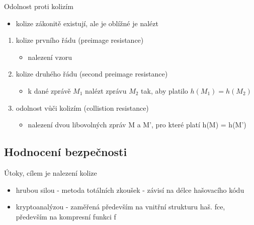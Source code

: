 Odolnost proti kolizím
\begin{itemize}
    \item kolize zákonitě existují, ale je oblížné je nalézt
\end{itemize}
\begin{enumerate}
    \item kolize prvního řádu (preimage resistance)
    \begin{itemize}
        \item nalezení vzoru
    \end{itemize}
    \item kolize druhého řádu (second preimage resistance)
    \begin{itemize}
        \item k dané zprávě $M_{1}$ nalézt zprávu $M_{2}$ tak, aby platilo $h(M_{1}) = h(M_{2})$
    \end{itemize}
    \item odolnost vůči kolizím (collistion resistance)
    \begin{itemize}
        \item nalezení dvou libovolných zpráv M a M', pro které platí h(M) = h(M') \\
    \end{itemize}
\end{enumerate}

\subsection{Hodnocení bezpečnosti}
Útoky, cílem je nalezení kolize
\begin{itemize}
    \item hrubou silou - metoda totálních zkoušek - závisí na délce hašovacího kódu
    \item kryptoanalýzou - zaměřená především na vnitřní strukturu haš. fce, především na kompresní funkci f
\end{itemize}

